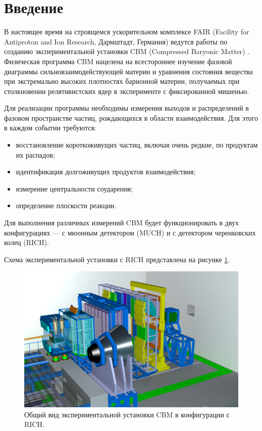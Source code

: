 \section*{Введение}\label{section:secIntro}

В настоящее время на строящемся ускорительном комплексе FAIR (Facility for Antiproton and Ion Research, Дармштадт, Германия) \cite{} ведутся работы по созданию экспериментальной установки CBM (Compressed Baryonic Matter) \cite{}. Физическая программа CBM нацелена на всестороннее изучение фазовой диаграммы сильновзаимодействующей материи и уравнения состояния вещества при экстремально высоких плотностях барионной материи, получаемых при столкновении релятивистских ядер в эксперименте с фиксированной мишенью.

Для реализации программы необходимы измерения выходов и распределений в фазовом пространстве частиц, рождающихся в области взаимодействия. Для этого в каждом событии требуются:
\begin{itemize}
\item {восстановление короткоживущих частиц, включая очень редкие, по продуктам их распадов;}
\item {идентификация долгоживущих продуктов взаимодействия;}
\item {измерение центральности соударения;}
\item {определение плоскости реакции.}
\end{itemize}

Для выполнения различных измерений CBM будет функционировать в двух конфигурациях --- с мюонным детектором (MUCH) и с детектором черенковских колец (RICH).

Схема экспериментальной установки с RICH представлена на рисунке \ref{fig:CBM}.

\begin{figure}
\includegraphics[width=1.0\textwidth]{pictures/1_CBM_SIS100.png}
\caption{Общий вид экспериментальной установки CBM в конфигурации с RICH.}
\label{fig:CBM}
\end{figure}

